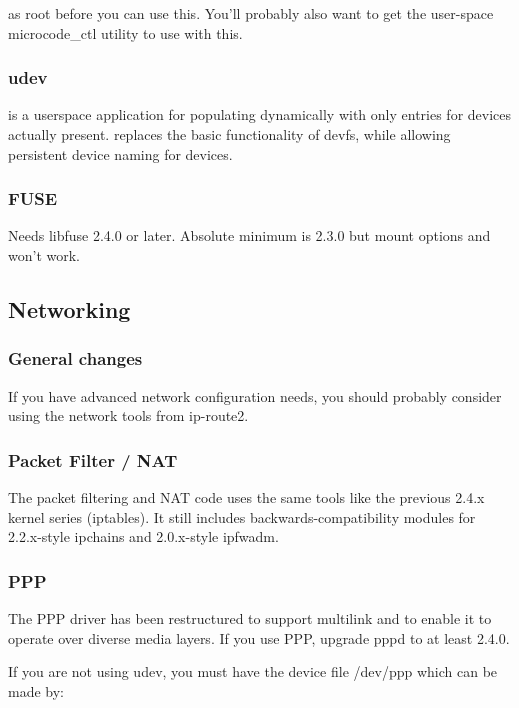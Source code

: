\documentclass[a4paper,8pt,english]{sphinxmanual}
\begin{document}
as root before you can use this.  You'll probably also want to
get the user-space microcode\_ctl utility to use with this.


\subsubsection{udev}
\label{process/changes:udev}
 is a userspace application for populating  dynamically with
only entries for devices actually present.  replaces the basic
functionality of devfs, while allowing persistent device naming for
devices.


\subsubsection{FUSE}
\label{process/changes:fuse}
Needs libfuse 2.4.0 or later.  Absolute minimum is 2.3.0 but mount
options  and  won't work.


\subsection{Networking}
\label{process/changes:networking}

\subsubsection{General changes}
\label{process/changes:general-changes}
If you have advanced network configuration needs, you should probably
consider using the network tools from ip-route2.


\subsubsection{Packet Filter / NAT}
\label{process/changes:packet-filter-nat}
The packet filtering and NAT code uses the same tools like the previous 2.4.x
kernel series (iptables).  It still includes backwards-compatibility modules
for 2.2.x-style ipchains and 2.0.x-style ipfwadm.


\subsubsection{PPP}
\label{process/changes:ppp}
The PPP driver has been restructured to support multilink and to
enable it to operate over diverse media layers.  If you use PPP,
upgrade pppd to at least 2.4.0.

If you are not using udev, you must have the device file /dev/ppp
which can be made by:
\end{document}
